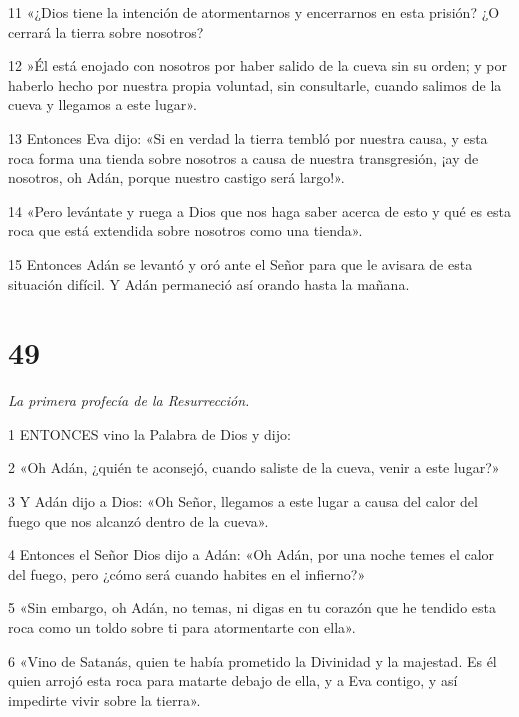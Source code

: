\par 11 «¿Dios tiene la intención de atormentarnos y encerrarnos en esta prisión? ¿O cerrará la tierra sobre nosotros?

\par 12 »Él está enojado con nosotros por haber salido de la cueva sin su orden; y por haberlo hecho por nuestra propia voluntad, sin consultarle, cuando salimos de la cueva y llegamos a este lugar».

\par 13 Entonces Eva dijo: «Si en verdad la tierra tembló por nuestra causa, y esta roca forma una tienda sobre nosotros a causa de nuestra transgresión, ¡ay de nosotros, oh Adán, porque nuestro castigo será largo!».

\par 14 «Pero levántate y ruega a Dios que nos haga saber acerca de esto y qué es esta roca que está extendida sobre nosotros como una tienda».

\par 15 Entonces Adán se levantó y oró ante el Señor para que le avisara de esta situación difícil. Y Adán permaneció así orando hasta la mañana.

\chapter{49}

\par \textit{La primera profecía de la Resurrección.}

\par 1 ENTONCES vino la Palabra de Dios y dijo:

\par 2 «Oh Adán, ¿quién te aconsejó, cuando saliste de la cueva, venir a este lugar?»

\par 3 Y Adán dijo a Dios: «Oh Señor, llegamos a este lugar a causa del calor del fuego que nos alcanzó dentro de la cueva».

\par 4 Entonces el Señor Dios dijo a Adán: «Oh Adán, por una noche temes el calor del fuego, pero ¿cómo será cuando habites en el infierno?»

\par 5 «Sin embargo, oh Adán, no temas, ni digas en tu corazón que he tendido esta roca como un toldo sobre ti para atormentarte con ella».

\par 6 «Vino de Satanás, quien te había prometido la Divinidad y la majestad. Es él quien arrojó esta roca para matarte debajo de ella, y a Eva contigo, y así impedirte vivir sobre la tierra».


